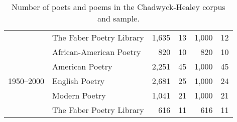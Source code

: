 \begin{table}[t]
{\begin{tabular}{llrrrr}
   & The Faber Poetry Library & 1,635 & 13 & 1,000 & 12 \\
  \cline{1-6}
  \multirow[t]{5}{*}{1950--2000} & African-American Poetry & 820 & 10 & 820 & 10 \\
   & American Poetry & 2,251 & 45 & 1,000 & 45 \\
   & English Poetry & 2,681 & 25 & 1,000 & 24 \\
   & Modern Poetry & 1,041 & 21 & 1,000 & 21 \\
   & The Faber Poetry Library & 616 & 11 & 616 & 11 \\
  \bottomrule
  \end{tabular}
  }
  \caption{Number of poets and poems in the Chadwyck-Healey corpus and sample.}
  \label{tab:num_poems_corpus}
\end{table}
